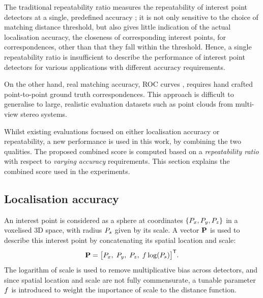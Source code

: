 The traditional repeatability ratio measures the repeatability of interest point detectors at a single, predefined accuracy \cite{Schmid2000}; it is not only sensitive to the choice of matching distance threshold, but also gives little indication of the actual localisation accuracy, \ie the closeness of corresponding interest points, for correspondences, other than that they fall within the threshold. Hence, a single repeatability ratio is insufficient to describe the performance of interest point detectors for various applications with different accuracy requirements. 

On the other hand, real matching accuracy, \eg ROC curves \cite{Bowyer1999}, requires hand crafted point-to-point ground truth correspondences. This approach is difficult to generalise to large, realistic evaluation datasets such as point clouds from multi-view stereo systems.     

Whilst existing evaluations focused on either localisation accuracy or repeatability, a new performance is used in this work, by combining the two qualities. The proposed combined score is computed based on a \emph{repeatability ratio} with respect to \emph{varying accuracy} requirements. This section explains the combined score used in the experiments. 

\subsection{Localisation accuracy}
An interest point is considered as a sphere at coordinates $\{P_x, P_y, P_z\}$ in a voxelised 3D space, with radius $P_s$ given by its scale. A vector $\mathbf{P}$ is used to describe this interest point by concatenating its spatial location and scale: 
\begin{equation}
	\mathbf{P} = \big[ P_x,\;P_y,\;P_z,\;f\log(P_s) \big]^\mathsf{T}.
\label{eqn/eval/loc_vec}
\end{equation}
The logarithm of scale is used to remove multiplicative bias across detectors, and since spatial location and scale are not fully commensurate, a tunable parameter $f$ is introduced to weight the importance of scale to the distance function.

